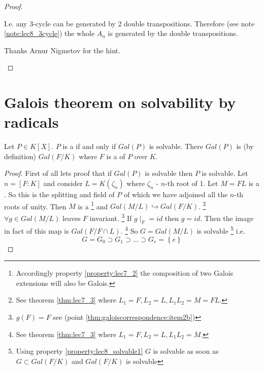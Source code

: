 \begin{theorem}[$S_n$ solvability]
\begin{proof}
\begin{enumerate}
{          I.e. any 3-cycle can be generated by 2 double
          transpositions. Therefore (see note \ref{note:lec8_3cycle})
          the whole $A_n$ is generated by 
          the double transpositions.

          Thanks Arnur Nigmetov for the hint.
        }
    \end{enumerate}
  \end{proof}
  \label{thm:lec8_sn_solvability}
\end{theorem}

\section{Galois theorem on solvability by radicals}

\begin{theorem}
  Let $P \in K\left[X\right]$. $P$ is a
   if and only if
  $Gal\left(P\right)$ is solvable. There
  $Gal\left(P\right)$ is (by definition) $Gal\left(F/K\right)$ where
  $F$ is a  of $P$ over $K$.
  \begin{proof}
    First of all lets proof that if $Gal\left(P\right)$ is solvable
    then $P$ is solvable. Let $n = \left[F:K\right]$ and consider
    $L = K\left(\zeta_n\right)$ where $\zeta_n$ - $n$-th root of 1.
    Let $M = FL$ is a . So this is the
    splitting and field of $P$ of which we have adjoined all the
    $n$-th roots of unity.  Then $M$ is a
    \footnote{
      Accordingly property \ref{property:lec7_2} the composition of
      two Galois extensions will also be Galois.
    }
    and
    $Gal\left(M/L\right) \hookrightarrow Gal\left(F/K\right)$.
    \footnote{
      See theorem \ref{thm:lec7_3} where $L_1 = F, L_2 = L, L_1 L_2 =
      M = FL$.
    }
    $\forall g \in Gal\left(M/L\right)$ leaves $F$ invariant.
    \footnote{
      $g(F) = F$ see  (point
      \ref{thm:galoiscorrespondence:item2b}) 
    }
    If $g\mid_F = id$ then $g = id$. Then the image in fact of this
    map is $Gal\left(F/F \cap L\right)$.
    \footnote{
      See theorem \ref{thm:lec7_3} where $L_1 = F, L_2 = L, L_1 L_2 =
      M$.
    }    
    So $G = Gal\left(M/L\right)$
    is solvable
    \footnote{
      Using property \ref{property:lec8_solvable1} $G$ is solvable as
      soon as $G \subset Gal\left(F/K\right)$ and 
      $Gal\left(F/K\right)$ is solvable
    }
    i.e. 
    \[
    G = G_0 \supset G_1 \supset \dots \supset G_r = \left\{e\right\}
\]
\end{proof}
\end{theorem}
